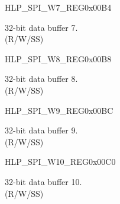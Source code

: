 \begin{register}{H}{LP\_SPI\_W7\_REG}{0x00B4}\label{regdesc:LPSPIW7REG}
%
\regnewline%
\begin{regdesc}\begin{reglist}
\label{fielddesc:LPSPIBUF7}\item [LP\_SPI\_BUF7] 32-bit data buffer 7.\\
(R/W/SS)
\end{reglist}\end{regdesc}
\end{register}


\begin{register}{H}{LP\_SPI\_W8\_REG}{0x00B8}\label{regdesc:LPSPIW8REG}
%
\regnewline%
\begin{regdesc}\begin{reglist}
\label{fielddesc:LPSPIBUF8}\item [LP\_SPI\_BUF8] 32-bit data buffer 8. \\
(R/W/SS)
\end{reglist}\end{regdesc}
\end{register}


\begin{register}{H}{LP\_SPI\_W9\_REG}{0x00BC}\label{regdesc:LPSPIW9REG}
%
\regnewline%
\begin{regdesc}\begin{reglist}
\label{fielddesc:LPSPIBUF9}\item [LP\_SPI\_BUF9] 32-bit data buffer 9. \\
(R/W/SS)
\end{reglist}\end{regdesc}
\end{register}


\begin{register}{H}{LP\_SPI\_W10\_REG}{0x00C0}\label{regdesc:LPSPIW10REG}
%
\regnewline%
\begin{regdesc}\begin{reglist}
\label{fielddesc:LPSPIBUF10}\item [LP\_SPI\_BUF10] 32-bit data buffer 10.\\
(R/W/SS)
\end{reglist}\end{regdesc}
\end{register}


